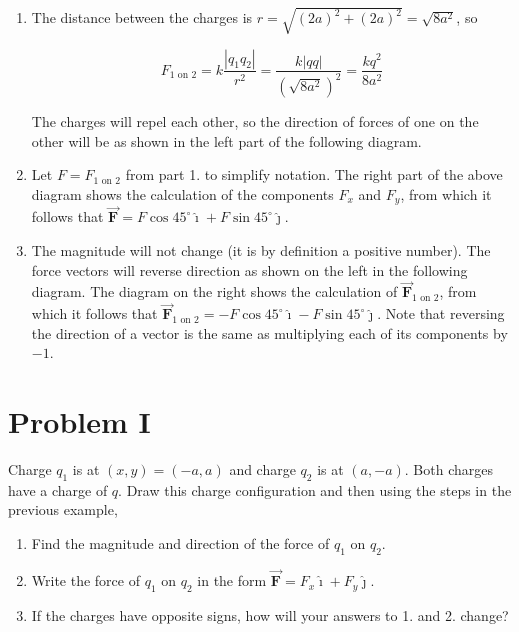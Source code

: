 \documentclass{article}
\renewcommand{\mbox}{\text}
\newcommand{\ihat}[0]{\hat{\boldsymbol{\imath}}}
\newcommand{\jhat}[0]{\hat{\boldsymbol{\jmath}}}
\newcommand{\bfvec}[1]{\vec{\mathbf{#1}}}
\begin{document}
\begin{enumerate}

  \item The distance between the charges is $r=\sqrt{(2a)^2+(2a)^2}=\sqrt{8a^2}$, so

        \begin{equation}
        F_{1\mbox{ on } 2}=k\frac{|q_1q_2|}{r^2}=\frac{k|qq|}{(\sqrt{8a^2})^2}=\frac{kq^2}{8a^2}
        \end{equation}

        The charges will repel each other, so the direction of forces of one on the other will be as shown in the left part of the following diagram.

        

  \item Let $F = F_{1\mbox{ on } 2}$ from part 1. to simplify notation. The right part of the above diagram shows the calculation of the components $F_x$ and $F_y$, from which it follows that $\bfvec{F} = F\cos 45^\circ \ihat + F\sin 45^\circ \jhat$.

  \item The magnitude will not change (it is by definition a positive number). The force vectors will reverse direction as shown on the left in the following diagram. The diagram on the right shows the calculation of $\bfvec{F}_{1\mbox{ on } 2}$, from which it follows that $\bfvec{F}_{1\mbox{ on } 2} = -F\cos 45^\circ \ihat - F\sin 45^\circ \jhat$. Note that reversing the direction of a vector is the same as multiplying each of its components by $-1$.

        

\end{enumerate}

\section{Problem I}

Charge $q_1$ is at $(x,y)=(-a,a)$ and charge $q_2$ is at $(a, -a)$. Both charges have a charge of $q$. Draw this charge configuration and then using the steps in the previous example,

\begin{enumerate}

  \item Find the magnitude and direction of the force of $q_1$ on $q_2$.

  \item Write the force of $q_1$ on $q_2$ in the form $\bfvec{F}=F_x\ihat + F_y\jhat$.

  \item If the charges have opposite signs, how will your answers to 1. and 2. change?

\end{enumerate}
\end{document}
